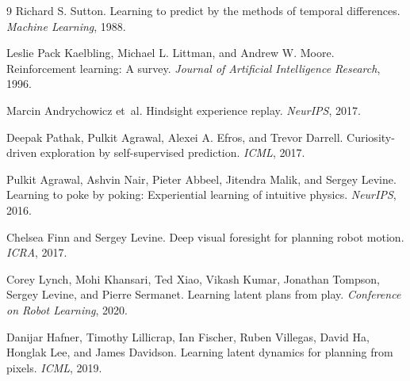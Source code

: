 \documentclass{article}
\begin{document}
\begin{thebibliography}{9}
Richard S. Sutton.
\newblock Learning to predict by the methods of temporal differences.
\newblock \emph{Machine Learning}, 1988.

Leslie Pack Kaelbling, Michael L. Littman, and Andrew W. Moore.
\newblock Reinforcement learning: A survey.
\newblock \emph{Journal of Artificial Intelligence Research}, 1996.

Marcin Andrychowicz et~al.
\newblock Hindsight experience replay.
\newblock \emph{NeurIPS}, 2017.

Deepak Pathak, Pulkit Agrawal, Alexei A. Efros, and Trevor Darrell.
\newblock Curiosity-driven exploration by self-supervised prediction.
\newblock \emph{ICML}, 2017.

Pulkit Agrawal, Ashvin Nair, Pieter Abbeel, Jitendra Malik, and Sergey Levine.
\newblock Learning to poke by poking: Experiential learning of intuitive physics.
\newblock \emph{NeurIPS}, 2016.

Chelsea Finn and Sergey Levine.
\newblock Deep visual foresight for planning robot motion.
\newblock \emph{ICRA}, 2017.

Corey Lynch, Mohi Khansari, Ted Xiao, Vikash Kumar, Jonathan Tompson, Sergey Levine, and Pierre Sermanet.
\newblock Learning latent plans from play.
\newblock \emph{Conference on Robot Learning}, 2020.

Danijar Hafner, Timothy Lillicrap, Ian Fischer, Ruben Villegas, David Ha, Honglak Lee, and James Davidson.
\newblock Learning latent dynamics for planning from pixels.
\newblock \emph{ICML}, 2019.
\end{thebibliography}
\end{document}
